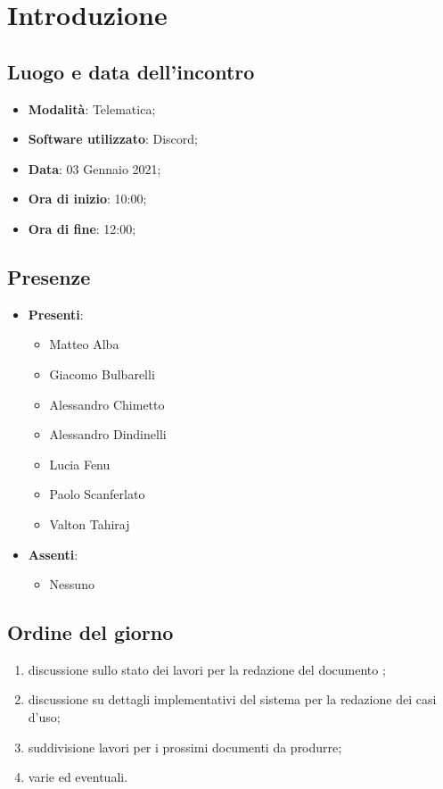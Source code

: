 \documentclass[]{article}
\begin{document}
	

	\newpage

	\section{Introduzione}
		\subsection{Luogo e data dell'incontro}
		\begin{itemize}
			\item \textbf{Modalità}: Telematica;
			\item \textbf{Software utilizzato}: Discord;
			\item \textbf{Data}: 03 Gennaio 2021;
			\item \textbf{Ora di inizio}: 10:00;
			\item \textbf{Ora di fine}: 12:00;
		\end{itemize}

		\subsection{Presenze}
		\begin{itemize}
			\item \textbf{Presenti}:
		\begin{itemize}
			\item Matteo Alba
			\item Giacomo Bulbarelli
			\item Alessandro Chimetto
			\item Alessandro Dindinelli
			\item Lucia Fenu
			\item Paolo Scanferlato
			\item Valton Tahiraj
		\end{itemize}
			\item \textbf{Assenti}:
			\begin{itemize}
				\item Nessuno
			\end{itemize}
		\end{itemize}

		\subsection{Ordine del giorno}
		\begin{enumerate}
            \item discussione sullo stato dei lavori per la redazione del documento ;
            \item discussione su dettagli implementativi del sistema per la redazione dei casi d'uso;
            \item suddivisione lavori per i prossimi documenti da produrre;
            \item varie ed eventuali.
		\end{enumerate}
\end{document}
